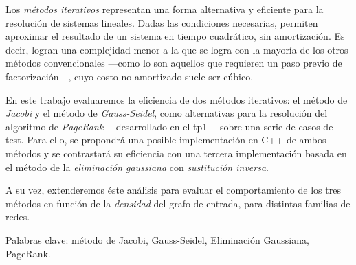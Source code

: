 Los \textit{métodos iterativos} representan una forma alternativa y eficiente para la resolución de sistemas lineales. Dadas las condiciones necesarias, permiten aproximar el resultado de un sistema en tiempo cuadrático, sin amortización. Es decir, logran una complejidad  menor a la que se logra con la mayoría de los otros métodos convencionales ---como lo son aquellos que requieren un paso previo de factorización---, cuyo costo no amortizado suele ser cúbico.

\vspace{1em}
En este trabajo evaluaremos la eficiencia de dos métodos iterativos: el método de \textit{Jacobi} y el método de \textit{Gauss-Seidel}, como alternativas para la resolución del algoritmo de \textit{PageRank} ---desarrollado en el tp1--- sobre una serie de casos de test. Para ello, se propondrá una posible implementación en C++ de ambos métodos y se contrastará su eficiencia con una tercera implementación basada en el método de la \textit{eliminación gaussiana} con \textit{sustitución inversa}.

A su vez, extenderemos éste análisis para evaluar el comportamiento de los tres métodos en función de la \textit{densidad} del grafo de entrada, para distintas familias de redes. 

\vspace{1em}
\noindent Palabras clave: método de Jacobi, Gauss-Seidel, Eliminación Gaussiana, PageRank.
